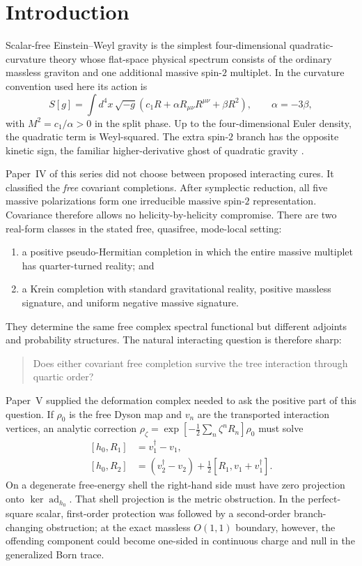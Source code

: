 \documentclass[11pt]{article}
\theoremstyle{definition}
\theoremstyle{remark}
\newcommand{\dg}{\dagger}
\newcommand{\ad}{\operatorname{ad}}
\begin{document}
\tableofcontents

\section{Introduction}\label{sec:intro}

Scalar-free Einstein--Weyl gravity is the simplest four-dimensional
quadratic-curvature theory whose flat-space physical spectrum consists of
the ordinary massless graviton and one additional massive spin-$2$
multiplet.  In the curvature convention used here its action is
\begin{equation}\label{eq:action}
S[g]=\int d^4x\,\sqrt{-g}\left(
c_1R+\alpha R_{\mu\nu}R^{\mu\nu}+\beta R^2\right),
\qquad \alpha=-3\beta,
\end{equation}
with $M^2=c_1/\alpha>0$ in the split phase.  Up to the four-dimensional
Euler density, the quadratic term is Weyl-squared.  The extra spin-$2$
branch has the opposite kinetic sign, the familiar higher-derivative
ghost of quadratic gravity \cite{Stelle}.

Paper~IV of this series \cite{paperIV} did not choose between proposed
interacting cures.  It classified the \emph{free} covariant completions.
After symplectic reduction, all five massive polarizations form one
irreducible massive spin-$2$ representation.  Covariance therefore
allows no helicity-by-helicity compromise.  There are two real-form
classes in the stated free, quasifree, mode-local setting:
\begin{enumerate}
\item a positive pseudo-Hermitian completion in which the entire massive
multiplet has quarter-turned reality; and
\item a Krein completion with standard gravitational reality, positive
massless signature, and uniform negative massive signature.
\end{enumerate}
They determine the same free complex spectral functional but different
adjoints and probability structures.  The natural interacting question
is therefore sharp:
\begin{quote}
Does either covariant free completion survive the tree interaction
through quartic order?
\end{quote}

Paper~V \cite{paperV} supplied the deformation complex needed to ask the
positive part of this question.  If $\rho_0$ is the free Dyson map and
$v_n$ are the transported interaction vertices, an analytic correction
$\rho_\zeta=\exp[-\tfrac12\sum_n\zeta^nR_n]\rho_0$ must solve
\begin{align}\label{eq:defcomplex}
[h_0,R_1]&=v_1^{\dg}-v_1,\nonumber\\
[h_0,R_2]&=(v_2^{\dg}-v_2)
+\frac12[R_1,v_1+v_1^{\dg}].
\end{align}
On a degenerate free-energy shell the right-hand side must have zero
projection onto $\ker\ad_{h_0}$.  That shell projection is the metric
obstruction.  In the perfect-square scalar, first-order protection was
followed by a second-order branch-changing obstruction; at the exact
massless $O(1,1)$ boundary, however, the offending component could become
one-sided in continuous charge and null in the generalized Born trace.
\end{document}
